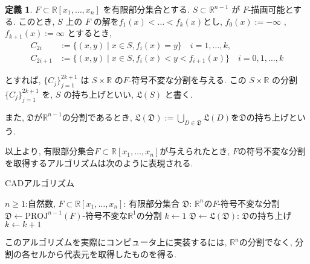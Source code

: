 \documentclass[dvipdfmx,uplatex]{jsarticle}
\newcommand{\R}{\mathbb{R}}
\newcommand{\PROJ}{\mathrm{PROJ}}
\theoremstyle{definition}
\newtheorem{definition}{定義}[section]
\begin{document}
\begin{definition}
$ F \subset \mathbb{R}[x_1,\dots,x_n] $ を有限部分集合とする. $ S \subset \mathbb{R}^{n-1} $ が $ F $-描画可能とする.
このとき, $ S $ 上の $ F $ の解を$ f_1(x)< \dots <f_k(x) $とし, $ f_0(x) := -\infty $ , $ f_{k+1}(x) := \infty $ とするとき,
\begin{align*}
  C_{2i} &:= \{(x,y) \mid  x \in S, f_i(x) = y \} \quad i = 1,\dots, k,\\
  C_{2i+1} &:= \{(x,y) \mid x \in S, f_{i}(x)<y<f_{i+1}(x) \} \quad i = 0,1, \dots, k 
\end{align*}

とすれば, $\{C_j\}_{j=1}^{2k+1}$ は $ S \times \mathbb{R} $ の$F$-符号不変な分割を与える.
この $ S \times \mathbb{R} $ の分割 $ \{C_j\}_{j=1}^{2k+1} $ を, $ S $ の持ち上げといい, $ \mathfrak{L}(S) $ と書く.

また, $\mathfrak{D}$が$\R^{n-1}$の分割であるとき, $\mathfrak{L}(\mathfrak{D}) := \bigcup_{D \in \mathfrak{D}}\mathfrak{L}(D)$を$\mathfrak{D}$の持ち上げという.
\end{definition}

以上より, 有限部分集合$F \subset \R[x_1, \dots, x_n]$が与えられたとき, $F$の符号不変な分割を取得するアルゴリズムは次のように表現される.

\begin{algorithm}
    \caption{CADアルゴリズム}
    \begin{algorithmic}[1]
    \REQUIRE $n \geq 1$:自然数, $F \subset \R[x_1, \dots, x_n]$: 有限部分集合
    \ENSURE $\mathfrak{D}$: $\R^n$の$F$-符号不変な分割
    \STATE $\mathfrak{D} \leftarrow \text{$\PROJ^{n-1}(F)$-符号不変な$\R^1$の分割}$
    \STATE $k \leftarrow 1$
    \STATE $\mathfrak{D} \leftarrow \text{$\mathfrak{L}(\mathfrak{D})$: $\mathfrak{D}$の持ち上げ}$
    \STATE $k \leftarrow k+1$
    \ENDWHILE
    \end{algorithmic}
\end{algorithm}

このアルゴリズムを実際にコンピュータ上に実装するには, $\R^n$の分割でなく, 分割の各セルから代表元を取得したものを得る. 
\end{document}
